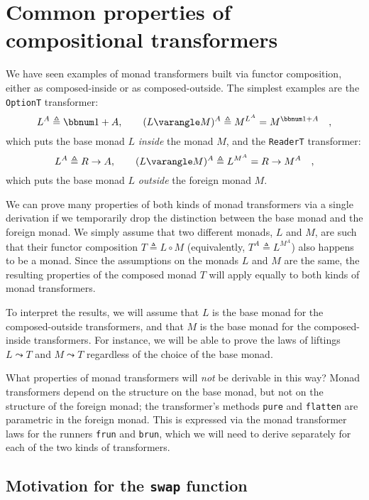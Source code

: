 \section{Common properties of compositional transformers \label{sec:Monad-transformers-that-use-composition}}

We have seen examples of monad transformers built via functor composition,
either as composed-inside or as composed-outside. The simplest examples
are the \lstinline!OptionT! transformer:
\[
L^{A}\triangleq\bbnum 1+A,\quad\quad(L\varangle M)^{A}\triangleq M^{L^{A}}=M^{\bbnum 1+A}\quad,
\]
which puts the base monad $L$ \emph{inside} the monad $M$, and the
\lstinline!ReaderT! transformer:
\[
L^{A}\triangleq R\rightarrow A,\quad\quad(L\varangle M)^{A}\triangleq L^{M^{A}}=R\rightarrow M^{A}\quad,
\]
which puts the base monad $L$ \emph{outside} the foreign monad $M$. 

We can prove many properties of both kinds of monad transformers via
a single derivation if we temporarily drop the distinction between
the base monad and the foreign monad. We simply assume that two different
monads, $L$ and $M$, are such that their functor composition $T\triangleq L\circ M$
(equivalently, $T^{A}\triangleq L^{M^{A}}$) also happens to be a
monad. Since the assumptions on the monads $L$ and $M$ are the same,
the resulting properties of the composed monad $T$ will apply equally
to both kinds of monad transformers.

To interpret the results, we will assume that $L$ is the base monad
for the composed-outside transformers, and that $M$ is the base monad
for the composed-inside transformers. For instance, we will be able
to prove the laws of liftings $L\leadsto T$ and $M\leadsto T$ regardless
of the choice of the base monad.

What properties of monad transformers will \emph{not} be derivable
in this way? Monad transformers depend on the structure on the base
monad, but not on the structure of the foreign monad; the transformer\textsf{'}s
methods \lstinline!pure! and \lstinline!flatten! are parametric
in the foreign monad. This is expressed via the monad transformer
laws for the runners \lstinline!frun! and \lstinline!brun!, which
we will need to derive separately for each of the two kinds of transformers.

\subsection{Motivation for the \texttt{swap} function}

